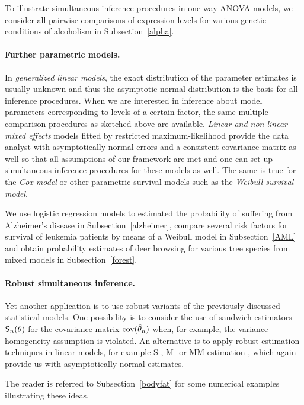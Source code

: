 \documentclass[12pt,a4paper]{article}
\begin{document}
To illustrate simultaneous inference procedures in one-way ANOVA models, we
consider all pairwise comparisons of expression levels for various genetic
conditions of alcoholism in Subsection~\ref{alpha}.

\paragraph{Further parametric models.}

In \emph{generalized linear models}, the exact distribution of the parameter
estimates is usually unknown and thus the asymptotic normal distribution is
the basis for all inference procedures. When we are interested in inference
about model parameters corresponding to levels of a certain factor, the same
multiple comparison procedures as sketched above are available. \emph{Linear
and non-linear mixed effects} models fitted by restricted maximum-likelihood
provide the data analyst with asymptotically normal errors and a consistent
covariance matrix as well so that all assumptions of our framework are met
and one can set up simultaneous inference procedures for these models as
well. The same is true for the \emph{Cox model} or other parametric survival
models such as the \emph{Weibull survival model}.

We use logistic regression models to estimated the probability of suffering
from Alzheimer's disease in Subsection~\ref{alzheimer}, compare several risk
factors for survival of leukemia patients by means of a Weibull model in
Subsection~\ref{AML} and obtain probability estimates of deer browsing for
various tree species from mixed models in Subsection~\ref{forest}.

\paragraph{Robust simultaneous inference.}

Yet another application is to use robust variants of the previously
discussed statistical models. One possibility is to consider the use of
sandwich estimators $\S_n(\theta)$ for the covariance matrix
$\cov(\hat{\theta}_n)$ when,
for example, the variance homogeneity assumption is violated. An alternative
is to apply robust estimation techniques in linear models, for example S-,
M- or MM-estimation 
\citep[see][for
example]{RousseeuwLeroy2003, mfluc:Stefanski+Boos:2002, Yohai1987, mfluc:White:1994}%
, which again provide us with asymptotically normal estimates.

The reader is referred to Subsection~\ref{bodyfat} for some numerical
examples illustrating these ideas.
\end{document}
